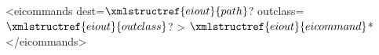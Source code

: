 <eicommands dest=$\xmlstructref{eiout}{path}$? outclass=$\xmlstructref{eiout}{outclass}$? >
  $\xmlstructref{eiout}{eicommand}$*
</eicommands>

